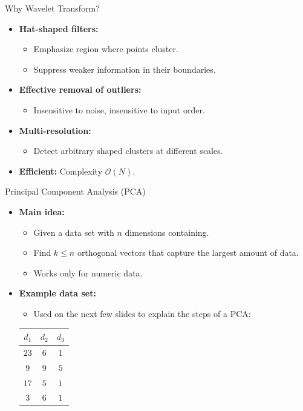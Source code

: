 \begin{frame}{Why Wavelet Transform?}
	\begin{itemize}
		\item \textbf{Hat-shaped filters:}
		\begin{itemize}
			\item Emphasize region where points cluster.
			\item Suppress weaker information in their boundaries.
		\end{itemize}
		\item \textbf{Effective removal of outliers:}
		\begin{itemize}
			\item Insensitive to noise, insensitive to input order.
		\end{itemize}
		\item \textbf{Multi-resolution:}
		\begin{itemize}
			\item Detect arbitrary shaped clusters at different scales.
		\end{itemize}
		\item \textbf{Efficient:} Complexity $\mathcal{O}(N)$.
	\end{itemize}
\end{frame}

\begin{frame}{Principal Component Analysis (PCA)}
	\begin{itemize}
		\item \textbf{Main idea:}
		\begin{itemize}
			\item Given a data set with $n$ dimensions containing.
			\item Find $k \leq n$ orthogonal vectors that capture the largest 
			amount of data.
			\item Works only for numeric data.
		\end{itemize}
		\item \textbf{Example data set:}
		\begin{itemize}
			\item Used on the next few slides to explain the steps of a PCA:
		\end{itemize}
		\vspace{3mm}
		\centering
		\begin{tabular}{|c|c|c|}
			\hline
			$d_1$ 	& $d_2$ 	& $d_3$
			\\\hline
			$23$	& $6$ 		& $1$                   
			\\\hline
			$9$		& $9$ 		& $5$                
			\\\hline
			$17$	& $5$ 		& $1$         
			\\\hline
			$3$		& $6$ 		& $1$         
			\\\hline
		\end{tabular}
	\end{itemize}
\end{frame}

